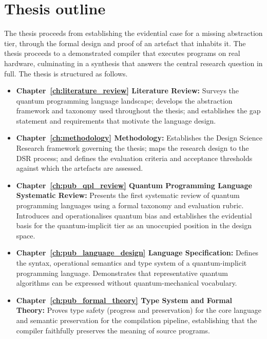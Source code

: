 \section{Thesis outline}\label{sec:introduction:thesis_outline}
The thesis proceeds from establishing the evidential case for a missing abstraction tier, through the formal design and proof of an artefact that inhabits it.
The thesis proceeds to a demonstrated compiler that executes programs on real hardware, culminating in a synthesis that answers the central research question in full.
The thesis is structured as follows.

\begin{itemize}

    \item \textbf{Chapter~\ref{ch:literature_review} Literature Review:}
    Surveys the quantum programming language landscape; develops the abstraction framework and taxonomy used throughout the thesis; and establishes the gap statement and requirements that motivate the language design.

    \item \textbf{Chapter~\ref{ch:methodology} Methodology:}
    Establishes the Design Science Research framework governing the thesis; maps the research design to the DSR process; and defines the evaluation criteria and acceptance thresholds against which the artefacts are assessed.

    \item \textbf{Chapter~\ref{ch:pub_qpl_review} Quantum Programming Language Systematic Review:}
    Presents the first systematic review of quantum programming languages using a formal taxonomy and evaluation rubric.
    Introduces and operationalises quantum bias and establishes the evidential basis for the quantum-implicit tier as an unoccupied position in the design space.

    \item \textbf{Chapter~\ref{ch:pub_language_design} Language Specification:}
    Defines the syntax, operational semantics and type system of a quantum-implicit programming language.
    Demonstrates that representative quantum algorithms can be expressed without quantum-mechanical vocabulary.

    \item \textbf{Chapter~\ref{ch:pub_formal_theory} Type System and Formal Theory:}
    Proves type safety (progress and preservation) for the core language and semantic preservation for the compilation pipeline, establishing that the compiler faithfully preserves the meaning of source programs.


\end{itemize}
